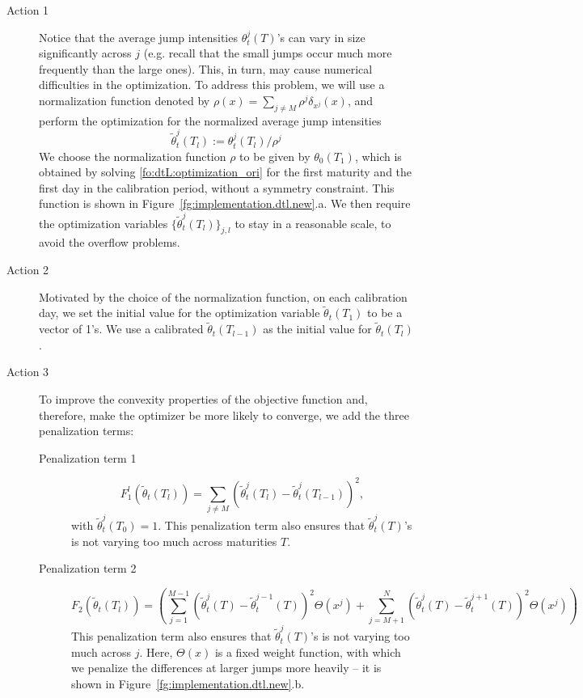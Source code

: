 \documentclass{article}
\numberwithin{equation}{section}
\begin{document}
\begin{description}
\item[Action 1]
Notice that the average jump intensities $\theta^j_t(T)$'s can vary in size significantly across $j$ (e.g. recall that the small jumps occur much more frequently than the large ones). This, in turn, may cause numerical difficulties in the optimization.
To address this problem, we will use a normalization function denoted by $\rho(x) = \sum_{j\neq M}\rho^j \delta_{x^j}(x)$, and perform the optimization for the normalized average jump intensities 
$$
\tilde{\theta}_t^j(T_l) := \theta_t^j(T_l)/\rho^j
$$ 
We choose the normalization function $\rho$ to be given by $\theta_0(T_1)$, which is obtained by solving \eqref{fo:dtL:optimization_ori} for the first maturity and the first day in the calibration period, without a symmetry constraint. This function is shown in Figure~\ref{fg:implementation.dtl.new}.a. We then require the optimization variables $\{\tilde{\theta}_t^j(T_l)\}_{j,l}$ to stay in a reasonable scale, to avoid the overflow problems.

\item[Action 2]
Motivated by the choice of the normalization function, on each calibration day, we set the initial value for the optimization variable $\tilde{\theta}_t(T_1)$ to be a vector of 1's. We use a calibrated $\tilde{\theta}_t(T_{l-1})$ as the initial value for $\tilde{\theta}_t(T_{l})$. 

\item[Action 3]
To improve the convexity properties of the objective function and, therefore, make the optimizer be more likely to converge, we add the three penalization terms:
\begin{description}
\item[Penalization term 1]  \begin{equation}\label{fo:dtL:penalized1}
    F^l_1(\tilde{\theta}_t(T_l)) = \sum_{j\neq M} (\tilde{\theta}^j_t(T_l) - \tilde{\theta}^j_t(T_{l-1}) )^2,
    \end{equation}
with $\tilde{\theta}^j_t(T_0) = 1$. This penalization term also ensures that $\tilde{\theta}^j_t(T)$'s is not varying too much across maturities $T$. 
    
\item[Penalization term 2]
\begin{equation} \label{fo:dtL:penalized2}
F_2(\tilde{\theta}_t(T_l)) = \left( \sum_{j=1}^{M-1} (\tilde{\theta}_t^j(T) - \tilde{\theta}_t^{j-1}(T) )^2 \Theta (x^j) + \sum_{j=M+1}^{N}  (\tilde{\theta}_t^j(T) - \tilde{\theta}_t^{j+1}(T))^2 \Theta(x^j) \right)
\end{equation}
This penalization term also ensures that $\tilde{\theta}^j_t(T)$'s is not varying too much across $j$. Here, $\Theta(x)$ is a fixed weight function, with which we penalize the differences at larger jumps more heavily -- it is shown in Figure~\ref{fg:implementation.dtl.new}.b.


\end{description}
\end{description}
\end{document}

